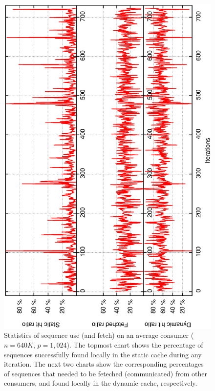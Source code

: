 \documentclass[10pt,journal,letterpaper,compsoc]{IEEEtran}
\begin{document}
\begin{figure}[thb]
\centerline{
						\includegraphics[angle=-90, scale=0.35]{fetch.eps}
            }
\caption{
Statistics of sequence use (and fetch) on an average consumer ($n=640K$, $p=1,024$).
The topmost chart shows the percentage of sequences successfully found locally in the static cache during any iteration. The next two charts show the corresponding percentages of sequences that needed to be feteched (communicated) from other consumers, and found locally in the dynamic cache, respectively.
}

\label{figConsumerFetch}
\end{figure}
\end{document}

